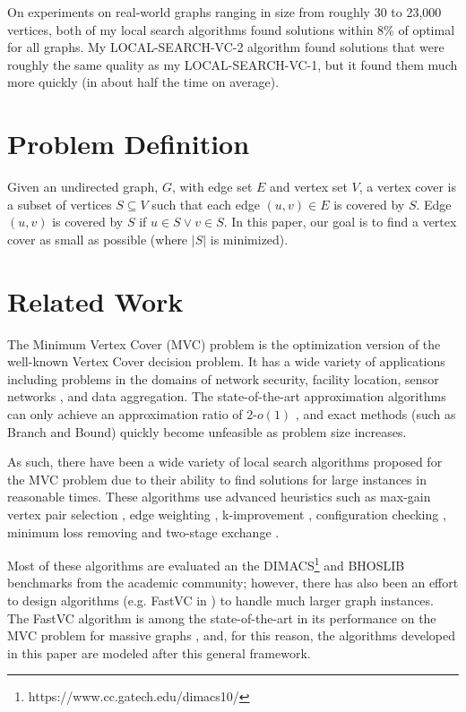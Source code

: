 \documentclass[sigconf]{acmart}
\begin{document}
On experiments on real-world graphs ranging in size from roughly 30 to 23,000 vertices, both of my local search algorithms found solutions within 8\% of optimal for all graphs. My LOCAL-SEARCH-VC-2 algorithm found solutions that were roughly the same quality as my LOCAL-SEARCH-VC-1, but it found them much more quickly (in about half the time on average).


\section{Problem Definition}
Given an undirected graph, $G$, with edge set $E$ and vertex set $V$, a vertex cover is a subset of vertices $S \subseteq V$ such that each edge $(u,v) \in E$ is covered by $S$. Edge $(u,v)$ is covered by $S$ if $u \in S \vee v \in S$. In this paper, our goal is to find a vertex cover as small as possible (where $|S|$ is minimized). 

\section{Related Work}
The Minimum Vertex Cover (MVC) problem is the optimization version of the well-known Vertex Cover decision problem. It has a wide variety of applications including problems in the domains of network security, facility location, sensor networks \cite{kavalci2014}, and data aggregation. The state-of-the-art approximation algorithms can only achieve an approximation ratio of 2-$o(1)$ \cite{halperin_2002}, and exact methods (such as Branch and Bound) quickly become unfeasible as problem size increases.

As such, there have been a wide variety of local search algorithms proposed for the MVC problem due to their ability to find solutions for large instances in reasonable times. These algorithms use advanced heuristics such as max-gain vertex pair selection \cite{richter_helmert_gretton}, edge weighting \cite{richter_helmert_gretton, cai2010}, k-improvement \cite{andrade_resende_werneck}, configuration checking \cite{cai_su_sattar_2011}, minimum loss removing and two-stage exchange \cite{cai2013numvc}. 

Most of these algorithms are evaluated an the DIMACS\footnote{https://www.cc.gatech.edu/dimacs10/} and BHOSLIB benchmarks from the academic community; however, there has also been an effort to design algorithms (e.g. FastVC in \cite{cai2015fastvc}) to handle much larger graph instances. The FastVC algorithm is among the state-of-the-art in its performance on the MVC problem for massive graphs \cite{cai2015fastvc}, and, for this reason, the algorithms developed in this paper are modeled after this general framework.
\end{document}
